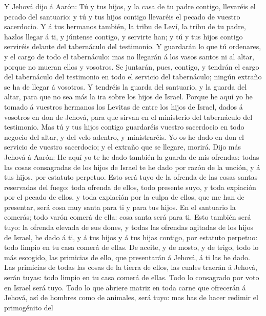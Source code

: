  Y Jehová dijo á Aarón: Tú y tus hijos, y la casa de tu
padre contigo, llevaréis el pecado del santuario: y tú y tus hijos
contigo llevaréis el pecado de vuestro sacerdocio.  Y á
tus hermanos también, la tribu de Leví, la tribu de tu padre, hazlos
llegar á ti, y júntense contigo, y servirte han; y tú y tus hijos
contigo serviréis delante del tabernáculo del testimonio. 
Y guardarán lo que tú ordenares, y el cargo de todo el tabernáculo: mas
no llegarán á los vasos santos ni al altar, porque no mueran ellos y
vosotros.  Se juntarán, pues, contigo, y tendrán el cargo
del tabernáculo del testimonio en todo el servicio del tabernáculo;
ningún extraño se ha de llegar á vosotros.  Y tendréis la
guarda del santuario, y la guarda del altar, para que no sea más la ira
sobre los hijos de Israel.  Porque he aquí yo he tomado á
vuestros hermanos los Levitas de entre los hijos de Israel, dados á
vosotros en don de Jehová, para que sirvan en el ministerio del
tabernáculo del testimonio.  Mas tú y tus hijos contigo
guardaréis vuestro sacerdocio en todo negocio del altar, y del velo
adentro, y ministraréis. Yo os he dado en don el servicio de vuestro
sacerdocio; y el extraño que se llegare, morirá.  Dijo más
Jehová á Aarón: He aquí yo te he dado también la guarda de mis ofrendas:
todas las cosas consagradas de los hijos de Israel te he dado por razón
de la unción, y á tus hijos, por estatuto perpetuo.  Esto
será tuyo de la ofrenda de las cosas santas reservadas del fuego: toda
ofrenda de ellos, todo presente suyo, y toda expiación por el pecado de
ellos, y toda expiación por la culpa de ellos, que me han de presentar,
será cosa muy santa para ti y para tus hijos.  En el
santuario la comerás; todo varón comerá de ella: cosa santa será para
ti.  Esto también será tuyo: la ofrenda elevada de sus
dones, y todas las ofrendas agitadas de los hijos de Israel, he dado á
ti, y á tus hijos y á tus hijas contigo, por estatuto perpetuo: todo
limpio en tu casa comerá de ellas.  De aceite, y de
mosto, y de trigo, todo lo más escogido, las primicias de ello, que
presentarán á Jehová, á ti las he dado.  Las primicias de
todas las cosas de la tierra de ellos, las cuales traerán á Jehová,
serán tuyas: todo limpio en tu casa comerá de ellas. 
Todo lo consagrado por voto en Israel será tuyo.  Todo lo
que abriere matriz en toda carne que ofrecerán á Jehová, así de hombres
como de animales, será tuyo: mas has de hacer redimir el primogénito del
